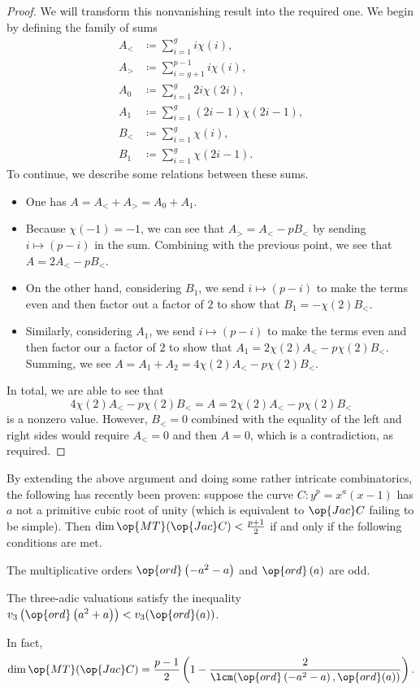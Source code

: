 \documentclass{article}
\begin{document}
\begin{proof}
	We will transform this nonvanishing result into the required one. We begin by defining the family of sums
	\begin{align*}
		A_< &\coloneqq \sum_{i=1}^gi\chi(i), \\
		A_> &\coloneqq \sum_{i=g+1}^{p-1}i\chi(i), \\
		A_0 &\coloneqq \sum_{i=1}^g2i\chi(2i), \\
		A_1 &\coloneqq \sum_{i=1}^g(2i-1)\chi(2i-1), \\
		B_< &\coloneqq \sum_{i=1}^g\chi(i), \\
		B_1 &\coloneqq \sum_{i=1}^g\chi(2i-1).
	\end{align*}
	To continue, we describe some relations between these sums.
	\begin{itemize}
		\item One has $A=A_<+A_>=A_0+A_1$.
		\item Because $\chi(-1)=-1$, we can see that $A_>=A_<-pB_<$ by sending $i\mapsto(p-i)$ in the sum. Combining with the previous point, we see that $A=2A_<-pB_<$.
		\item On the other hand, considering $B_1$, we send $i\mapsto(p-i)$ to make the terms even and then factor out a factor of $2$ to show that $B_1=-\chi(2)B_<$.
		\item Similarly, considering $A_1$, we send $i\mapsto(p-i)$ to make the terms even and then factor our a factor of $2$ to show that $A_1=2\chi(2)A_<-p\chi(2)B_<$. Summing, we see $A=A_1+A_2=4\chi(2)A_<-p\chi(2)B_<$.
	\end{itemize}
	In total, we are able to see that
	\[4\chi(2)A_<-p\chi(2)B_<=A=2\chi(2)A_<-p\chi(2)B_<\]
	is a nonzero value. However, $B_<=0$ combined with the equality of the left and right sides would require $A_<=0$ and then $A=0$, which is a contradiction, as required.
\end{proof}
\begin{remark}
	By extending the above argument and doing some rather intricate combinatorics, the following has recently been proven: suppose the curve $C\colon y^p=x^a(x-1)$ has $a$ not a primitive cubic root of unity (which is equivalent to $\op{Jac}C$ failing to be simple). Then $\dim\op{MT}(\op{Jac}C)<\frac{p+1}2$ if and only if the following conditions are met.
	\begin{listalph}
		\item The multiplicative orders $\op{ord}\left(-a^2-a\right)$ and $\op{ord}\left(a\right)$ are odd.
		\item The three-adic valuations satisfy the inequality $v_3\left(\op{ord}\left(a^2+a\right)\right)<v_3(\op{ord}(a))$.
	\end{listalph}
	In fact,
	\[\dim\op{MT}(\op{Jac}C)=\frac{p-1}2\left(1-\frac2{\lcm(\op{ord}\left(-a^2-a\right),\op{ord}(a))}\right).\]
\end{remark}

\end{document}
